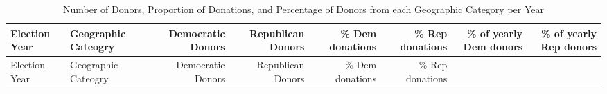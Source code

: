 \documentclass[10pt,]{article}
\begin{document}
\begin{longtable}[]{@{}llrrrrrr@{}}
\caption{Number of Donors, Proportion of Donations, and Percentage of
Donors from each Geographic Category per Year}\tabularnewline
\toprule
\begin{minipage}[b]{0.07\columnwidth}\raggedright
Election Year\strut
\end{minipage} & \begin{minipage}[b]{0.19\columnwidth}\raggedright
Geographic Cateogry\strut
\end{minipage} & \begin{minipage}[b]{0.08\columnwidth}\raggedleft
Democratic Donors\strut
\end{minipage} & \begin{minipage}[b]{0.08\columnwidth}\raggedleft
Republican Donors\strut
\end{minipage} & \begin{minipage}[b]{0.07\columnwidth}\raggedleft
\% Dem donations\strut
\end{minipage} & \begin{minipage}[b]{0.07\columnwidth}\raggedleft
\% Rep donations\strut
\end{minipage} & \begin{minipage}[b]{0.11\columnwidth}\raggedleft
\% of yearly Dem donors\strut
\end{minipage} & \begin{minipage}[b]{0.11\columnwidth}\raggedleft
\% of yearly Rep donors\strut
\end{minipage}\tabularnewline
\midrule
\endfirsthead
\toprule
\begin{minipage}[b]{0.07\columnwidth}\raggedright
Election Year\strut
\end{minipage} & \begin{minipage}[b]{0.19\columnwidth}\raggedright
Geographic Cateogry\strut
\end{minipage} & \begin{minipage}[b]{0.08\columnwidth}\raggedleft
Democratic Donors\strut
\end{minipage} & \begin{minipage}[b]{0.08\columnwidth}\raggedleft
Republican Donors\strut
\end{minipage} & \begin{minipage}[b]{0.07\columnwidth}\raggedleft
\% Dem donations\strut
\end{minipage} & \begin{minipage}[b]{0.07\columnwidth}\raggedleft
\% Rep donations\strut
\end{minipage} & \begin{minipage}[b]{0.11\columnwidth}\raggedleft

\end{minipage}
\end{longtable}
\end{document}

